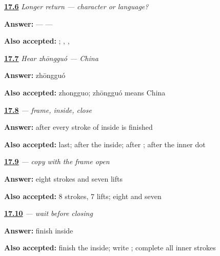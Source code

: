 \noindent\begin{minipage}[t]{\linewidth}
\raggedright
\hyperlink{review-ZH-R17-character-language-r2-write}{\textbf{17.6}} \emph{Longer return — character or language?}\par
\small \textbf{Answer:}  —  — \par
\footnotesize \textbf{Also accepted:}   ; , , 
\end{minipage}\par\medskip

\noindent\begin{minipage}[t]{\linewidth}
\raggedright
\hyperlink{review-ZH-C17-hear-zhongguo-meaning}{\textbf{17.7}} \emph{Hear \emph{zhōngguó} — China}\par
\small \textbf{Answer:} zhōngguó\par
\footnotesize \textbf{Also accepted:} zhongguo; zhōngguó means China
\end{minipage}\par\medskip

\noindent\begin{minipage}[t]{\linewidth}
\raggedright
\hyperlink{review-ZH-W17-guo-observe-close}{\textbf{17.8}} \emph{ — frame, inside, close}\par
\small \textbf{Answer:} after every stroke of  inside is finished\par
\footnotesize \textbf{Also accepted:} last; after the inside; after ; after the inner dot
\end{minipage}\par\medskip

\noindent\begin{minipage}[t]{\linewidth}
\raggedright
\hyperlink{review-ZH-W17-guo-guided-count}{\textbf{17.9}} \emph{ — copy with the frame open}\par
\small \textbf{Answer:} eight strokes and seven lifts\par
\footnotesize \textbf{Also accepted:} 8 strokes, 7 lifts; eight and seven
\end{minipage}\par\medskip

\noindent\begin{minipage}[t]{\linewidth}
\raggedright
\hyperlink{review-ZH-W17-guo-delayed-write}{\textbf{17.10}} \emph{ — wait before closing}\par
\small \textbf{Answer:} finish  inside\par
\footnotesize \textbf{Also accepted:} finish the inside; write ; complete all inner strokes
\end{minipage}\par\medskip

